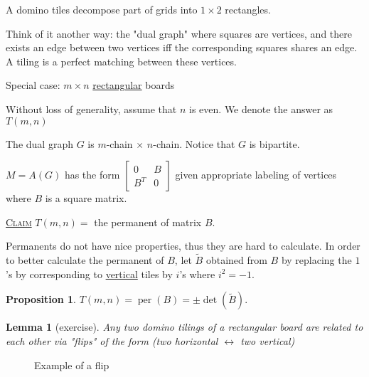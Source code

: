 \documentclass{report}
\def \per {\operatorname{per}}
\newcommand{\fancyem}[1]{\underline{\textsc{#1}}}
\newtheorem{lemma}{Lemma}[section]
\newtheorem{proposition}{Proposition}[section]
\theoremstyle{definition}
\theoremstyle{remark}
\numberwithin{equation}{section}
\begin{document}
A domino tiles decompose part of grids into $1 \times 2$ rectangles.

Think of it another way: the "dual graph" where squares are vertices, and there exists an edge between two vertices iff the corresponding squares shares an edge. A tiling is a perfect matching between these vertices. 

Special case: $m \times n$ \underline{rectangular} boards
\begin{figure}[h]
\centering
{}
\end{figure}

Without loss of generality, assume  that $n$ is even. We denote the answer as $T(m, n)$

The dual graph $G$ is $m$-chain $\times$ $n$-chain. Notice that $G$ is bipartite.

$M = A(G)$ has the form $\begin{bmatrix}
0 & B \\ B^T & 0
\end{bmatrix}$ given appropriate labeling of vertices where $B$ is a square matrix.

\fancyem{Claim} $T(m, n) =$ the permanent of matrix $B.$

Permanents do not have nice properties, thus they are hard to calculate. In order to better calculate the permanent of $B$, let $\tilde{B}$ obtained from $B$ by replacing the $1$'s by corresponding to \underline{vertical} tiles by $i$'s where $i^2 = -1.$

\begin{proposition}
$T(m, n) = \per(B) = \pm \det(\tilde{B}).$
\end{proposition}
\begin{lemma}[exercise]
Any two domino tilings of a rectangular board are related to each other via "flips" of the form (two horizontal $\leftrightarrow$ two vertical)
\end{lemma}

\begin{figure}[h]
\centering
{}
\caption{Example of a flip}
\end{figure}
\end{document}
